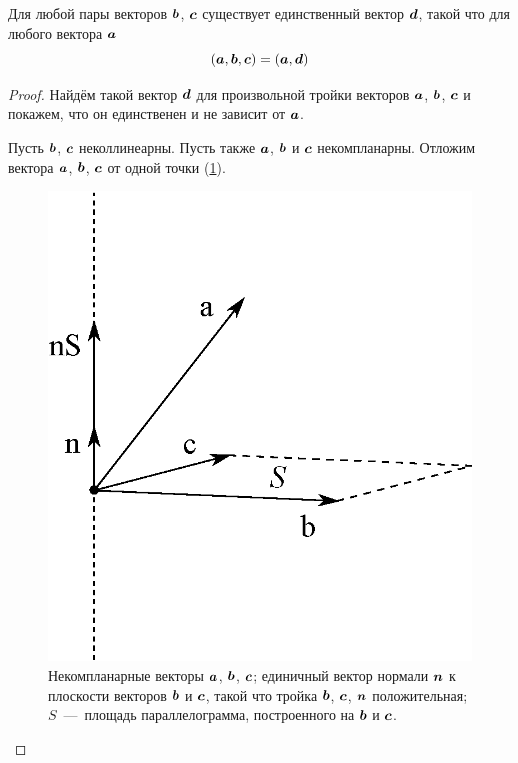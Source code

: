 \documentclass[a4paper,12pt]{article}
\begin{document}
  \begin{theorem}
    Для любой пары векторов $\boldsymbol b$, $\boldsymbol c$ существует единственный вектор $\boldsymbol d$, такой что для любого вектора $\boldsymbol a$
    \[
      (\boldsymbol a, \boldsymbol b, \boldsymbol c) = (\boldsymbol a, \boldsymbol d)
    \]
  \end{theorem}
  
  \begin{proof}
    Найдём такой вектор $\boldsymbol d$ для произвольной тройки векторов $\boldsymbol a$, $\boldsymbol b$, $\boldsymbol c$ и покажем, что он единственен и не зависит от $\boldsymbol a$.
    
    Пусть $\boldsymbol b$, $\boldsymbol c$ неколлинеарны.
    Пусть также $\boldsymbol a$, $\boldsymbol b$ и $\boldsymbol c$ некомпланарны.
    Отложим вектора $\boldsymbol a$, $\boldsymbol b$, $\boldsymbol c$ от одной точки (\ref{fig:triple-product}).
    
    \begin{figure}[h]
      \centering
      
      \includegraphics[width=0.5\columnwidth]{triple-product}
      
      \caption{Некомпланарные векторы $\boldsymbol a$, $\boldsymbol b$, $\boldsymbol c$; единичный вектор нормали $\boldsymbol n$ к плоскости векторов $\boldsymbol b$ и $\boldsymbol c$, такой что тройка $\boldsymbol b$, $\boldsymbol c$, $\boldsymbol n$ положительная; $S$~---~площадь параллелограмма, построенного на $\boldsymbol b$ и $\boldsymbol c$.}
      \label{fig:triple-product}
    \end{figure}
  

\end{proof}
\end{document}
